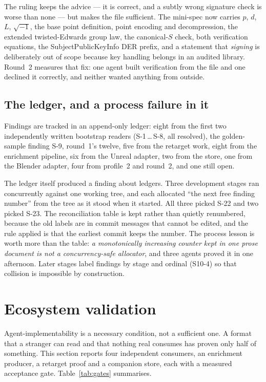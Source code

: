 \documentclass[10pt,twocolumn,letterpaper]{article}
\begin{document}
The ruling keeps the advice --- it is correct, and a subtly wrong signature check
is worse than none --- but makes the file sufficient. The mini-spec now carries
$p$, $d$, $L$, $\sqrt{-1}$, the base point definition, point encoding and
decompression, the extended twisted-Edwards group law, the canonical-$S$ check,
both verification equations, the SubjectPublicKeyInfo DER prefix, and a statement
that \emph{signing} is deliberately out of scope because key handling belongs in
an audited library. Round~2 measures that fix: one agent built verification from
the file and one declined it correctly, and neither wanted anything from outside.

\subsection{The ledger, and a process failure in it}

Findings are tracked in an append-only ledger: eight from the first two
independently written bootstrap readers (S-1\,\dots\,S-8, all resolved), the
golden-sample finding S-9, round~1's twelve, five from the retarget work, eight
from the enrichment pipeline, six from the Unreal adapter, two from the store, one
from the Blender adapter, four from profile~2 and round~2, and one still open.

The ledger itself produced a finding about ledgers. Three development stages ran
concurrently against one working tree, and each allocated ``the next free finding
number'' from the tree as it stood when it started. All three picked S-22 and two
picked S-23. The reconciliation table is kept rather than quietly renumbered,
because the old labels are in commit messages that cannot be edited, and the rule
applied is that the earliest commit keeps the number. The process lesson is worth
more than the table: \emph{a monotonically increasing counter kept in one prose
document is not a concurrency-safe allocator}, and three agents proved it in one
afternoon. Later stages label findings by stage and ordinal (S10-4) so that
collision is impossible by construction.


\section{Ecosystem validation}
\label{sec:ecosystem}

Agent-implementability is a necessary condition, not a sufficient one. A format
that a stranger can read and that nothing real consumes has proven only half of
something. This section reports four independent consumers, an enrichment
producer, a retarget proof and a companion store, each with a measured
acceptance gate. Table~\ref{tab:gates} summarises.
\end{document}
